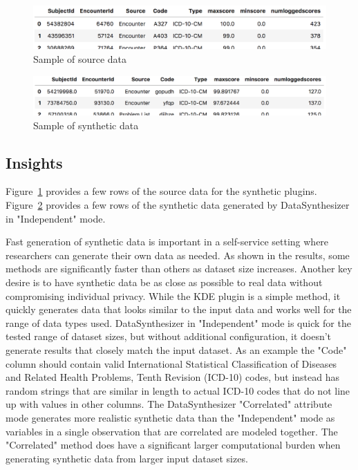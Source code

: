\documentclass{amia}
\begin{document}
\begin{figure}[ht]
  \centering
  \includegraphics[width=120mm]{sample_source_data}
  \caption{Sample of source data}
  \label{fig:sample_source_data}
\end{figure}
\begin{figure}[ht]
  \centering
  \includegraphics[width=120mm]{sample_synthetic_data}
  \caption{Sample of synthetic data}
  \label{fig:sample_synthetic_data}
\end{figure}

\subsection{Insights}

Figure~\ref{fig:sample_source_data} provides a few rows of the source data for the synthetic plugins. Figure~\ref{fig:sample_synthetic_data} provides a few rows of the synthetic data generated by DataSynthesizer in "Independent" mode.

Fast generation of synthetic data is important in a self-service setting where researchers can generate their own data as needed. As shown in the results, some methods are significantly faster than others as dataset size increases. Another key desire is to have synthetic data be as close as possible to real data without compromising individual privacy. While the KDE plugin is a simple method, it quickly generates data that looks similar to the input data and works well for the range of data types used. DataSynthesizer in "Independent" mode is quick for the tested range of dataset sizes, but without additional configuration, it doesn't generate results that closely match the input dataset. As an example the "Code" column should contain valid International Statistical Classification of Diseases and Related Health Problems, Tenth Revision (ICD-10) codes, but instead has random strings that are similar in length to actual ICD-10 codes that do not line up with values in other columns. The DataSynthesizer "Correlated" attribute mode generates more realistic synthetic data than the "Independent" mode as variables in a single observation that are correlated are modeled together. The "Correlated" method does have a significant larger computational burden when generating synthetic data from larger input dataset sizes.
\end{document}
